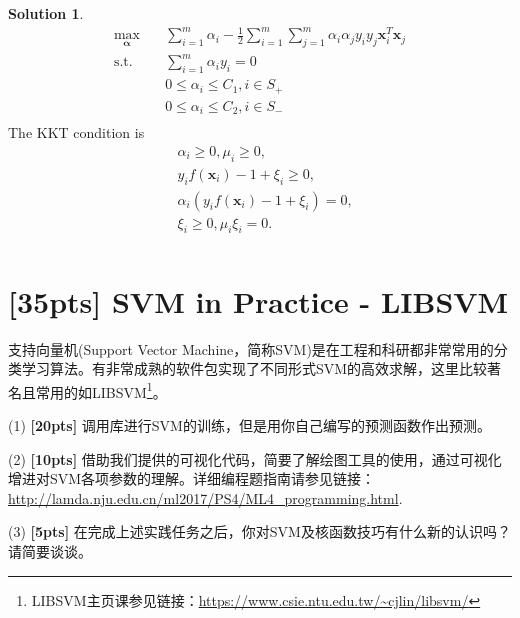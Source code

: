 \documentclass[a4paper,UTF8]{article}
\numberwithin{equation}{section}
\theoremstyle{definition}
\newtheorem*{solution}{Solution}
\begin{document}
\begin{solution}
\begin{equation}
\begin{split}
\max_\mathbf{\alpha}& \quad \sum_{i=1}^m \alpha_i - \frac{1}{2}\sum_{i=1}^m\sum_{j=1}^{m}\alpha_i\alpha_j y_i y_j \mathbf{x}_i^T\mathbf{x}_j\\
\text{s.t.}&  \quad \sum_{i=1}^m\alpha_i y_i = 0\\
& \quad 0 \leq \alpha_i \leq C_1, i \in S_+\\
& \quad 0 \leq \alpha_i \leq C_2, i \in S_-\\
\end{split}
\end{equation}
The KKT condition is\\
\begin{equation}
\begin{split}
& \alpha_i \geq 0, \mu_i \geq 0, \\
& y_i f(\mathbf{x}_i) - 1 + \xi_i \geq 0,\\
& \alpha_i(y_i f(\mathbf{x}_i) -1 + \xi_i) = 0,\\
& \xi_i \geq 0, \mu_i\xi_i=0.\\
\end{split}
\end{equation}

\end{solution}

\section{[35pts] SVM in Practice - LIBSVM} 
支持向量机(Support Vector Machine，简称SVM)是在工程和科研都非常常用的分类学习算法。有非常成熟的软件包实现了不同形式SVM的高效求解，这里比较著名且常用的如LIBSVM\footnote{LIBSVM主页课参见链接：\url{https://www.csie.ntu.edu.tw/~cjlin/libsvm/}}。

(1) \textbf{[20pts]} 调用库进行SVM的训练，但是用你自己编写的预测函数作出预测。

(2) \textbf{[10pts]} 借助我们提供的可视化代码，简要了解绘图工具的使用，通过可视化增进对SVM各项参数的理解。详细编程题指南请参见链接：\url{http://lamda.nju.edu.cn/ml2017/PS4/ML4_programming.html}. 

(3) \textbf{[5pts]} 在完成上述实践任务之后，你对SVM及核函数技巧有什么新的认识吗？请简要谈谈。
\end{document}
